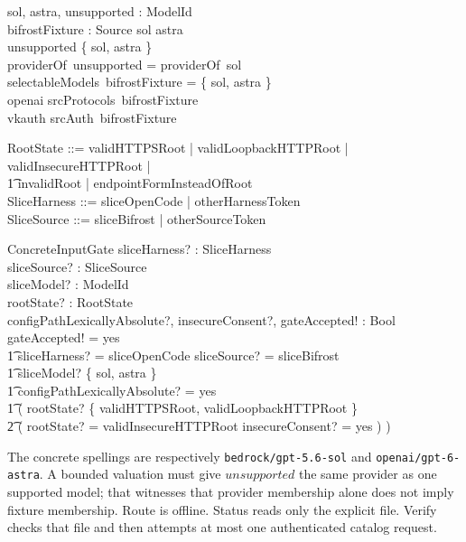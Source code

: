 \documentclass{article}
\begin{document}
\begin{axdef}
	sol, astra, unsupported : ModelId \\
	bifrostFixture : Source
	\where
	sol \neq astra \\
	unsupported \notin \{ sol, astra \} \\
	providerOf~unsupported = providerOf~sol \\
	selectableModels~bifrostFixture = \{ sol, astra \} \\
	openai \in srcProtocols~bifrostFixture \\
	vkauth \in srcAuth~bifrostFixture
\end{axdef}

\begin{zed}
	RootState ::= validHTTPSRoot | validLoopbackHTTPRoot | validInsecureHTTPRoot | \\
	\t1 invalidRoot | endpointFormInsteadOfRoot \\
	SliceHarness ::= sliceOpenCode | otherHarnessToken \\
	SliceSource ::= sliceBifrost | otherSourceToken
\end{zed}

\begin{schema}{ConcreteInputGate}
	sliceHarness? : SliceHarness \\
	sliceSource? : SliceSource \\
	sliceModel? : ModelId \\
	rootState? : RootState \\
	configPathLexicallyAbsolute?, insecureConsent?, gateAccepted! : Bool
	\where
	gateAccepted! = yes \iff \\
	\t1 sliceHarness? = sliceOpenCode \land sliceSource? = sliceBifrost \land \\
	\t1 sliceModel? \in \{ sol, astra \} \land \\
	\t1 configPathLexicallyAbsolute? = yes \land \\
	\t1 ( rootState? \in \{ validHTTPSRoot, validLoopbackHTTPRoot \} \lor \\
	\t2 ( rootState? = validInsecureHTTPRoot \land insecureConsent? = yes ) )
\end{schema}

The concrete spellings are respectively
\texttt{bedrock/gpt-5.6-sol} and \texttt{openai/gpt-6-astra}.  A bounded
valuation must give $unsupported$ the same provider as one supported model;
that witnesses that provider membership alone does not imply fixture
membership.  Route is offline.  Status reads only the explicit file.  Verify
checks that file and then attempts at most one authenticated catalog request.
\end{document}
